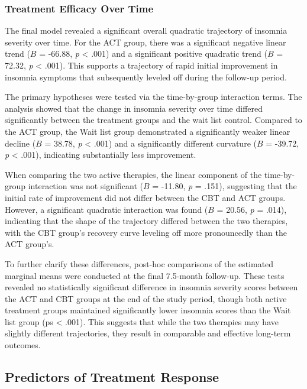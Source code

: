 \documentclass[
  english,
  man]{apa6}
\begin{document}
\subsubsection{Treatment Efficacy Over Time}\label{treatment-efficacy-over-time}

The final model revealed a significant overall quadratic trajectory of insomnia severity over time. For the ACT group, there was a significant negative linear trend (\(B\) = -66.88, \emph{p} \textless{} .001) and a significant positive quadratic trend (\(B\) = 72.32, \emph{p} \textless{} .001). This supports a trajectory of rapid initial improvement in insomnia symptoms that subsequently leveled off during the follow-up period.

The primary hypotheses were tested via the time-by-group interaction terms. The analysis showed that the change in insomnia severity over time differed significantly between the treatment groups and the wait list control. Compared to the ACT group, the Wait list group demonstrated a significantly weaker linear decline (\(B\) = 38.78, \emph{p} \textless{} .001) and a significantly different curvature (\(B\) = -39.72, \emph{p} \textless{} .001), indicating substantially less improvement.

When comparing the two active therapies, the linear component of the time-by-group interaction was not significant (\(B\) = -11.80, \emph{p} = .151), suggesting that the initial rate of improvement did not differ between the CBT and ACT groups. However, a significant quadratic interaction was found (\(B\) = 20.56, \emph{p} = .014), indicating that the shape of the trajectory differed between the two therapies, with the CBT group's recovery curve leveling off more pronouncedly than the ACT group's.

To further clarify these differences, post-hoc comparisons of the estimated marginal means were conducted at the final 7.5-month follow-up. These tests revealed no statistically significant difference in insomnia severity scores between the ACT and CBT groups at the end of the study period, though both active treatment groups maintained significantly lower insomnia scores than the Wait list group (ps \textless{} .001). This suggests that while the two therapies may have slightly different trajectories, they result in comparable and effective long-term outcomes.

\subsection{Predictors of Treatment Response}\label{predictors-of-treatment-response-1}
\end{document}
